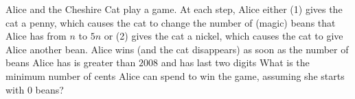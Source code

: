 Alice and the Cheshire Cat play a game. At each step, Alice either (1) gives the cat a penny, which causes the cat to change the number of (magic) beans that Alice has from $ n$ to $ 5n$ or (2) gives the cat a nickel, which causes the cat to give Alice another bean. Alice wins (and the cat disappears) as soon as the number of beans Alice has is greater than $ 2008$ and has last two digits  What is the minimum number of cents Alice can spend to win the game, assuming she starts with 0 beans?